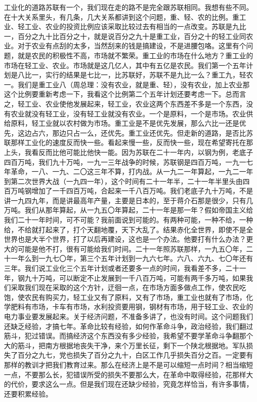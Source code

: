 工业化的道路苏联有一个，我们现在走的路不是完全跟苏联相同。我想有些不同。在十大关系里头，有几条，几大关系都讲到这个问题，重、轻、农的比例。重工业、轻工业、农业的投资比例应该采取比较过去有相当的一点改变。苏联是九比一，百分之九十比百分之十，就是说百分之九十是重工业，百分之十的轻工业同农业。对于农业有点刮的太多，当然刮来的钱是搞建设，不是进腰包咯。这里有个问题，就是农民的积极性不高，市场就不繁荣。重工业的市场在什么地方？重工业的市场在轻工业、农业。市场就是这几亿人，其中有五亿是农民。我们第一个五年计划是八比一，实行的结果是七比一，比苏联好，苏联不是九比一么？重工九，轻农一。我们是重工业八（周总理：没有农业，就是重、轻），没有农业，加上农业那这个比例要重新考虑一下，我看这个比例第二个五年计划还要考虑一下。总而言之，轻工业、农业使他发展起来，轻工业，农业这两个东西差不多是一个东西，没有农业就没有轻工业，没有轻工业就没有农业。一个是原料，一个是市场。农业供给原料，轻工业就以农村做为市场。重工业是不是优先发展，那么六比一还是优先，这边占六，那边只占一么，还优先。重工业还优先。但走新的道路，是否比苏联那样工业化的速度反而快一些。看起来慢一些，反而快一些，现在希望寄托在那上头，我看反而比他可能比他快一能。因为苏联在二十一年内，以钢为例，老底子四百万吨，我们九十万吨，一九一三年战争的时候，苏联钢是四百万吨，一九一七年革命，一八、一九、二〇这三年不算，打内战。从一九二一年算起，一九二一年到第二次世界大战（一九四一年），这个时间有二十一年半，二十一年半里头由四百万吨钢增加了一千四百万吨，合起来一千八百万吨。我们老底子九十万吨，不是讲一九四九年，而是讲最高年产量，主要是日本的，至于蒋介石那是很少，只有几万吨。我们从那年算起，从一九五〇年算起，二十一年是那一年？假如帝国主义给我们二十一年时间，可不可能？我前面说到可能的。有两种可能，一种不给，一种给，不给就打起来了，打个天翻地覆，天下大乱了。结果赤化全世界，即使不是全世界也是大半个世界，打了以后再建设，这也是一个办法。他要打有什么办法？更大的可能是他不打，很有可能给我们时间。二十一年照苏联那样，一九五〇年，二十一年么到一九七〇年，第三个五年计划到一九六七年。六八、六九、七〇年还有三年。我们说工业化三个五年计划或者还要多一点的时间，我看差不多，二十一年，钢九十万吨，可以断定不止发展到一千八百万吨，可能有两千多万吨，如果我们采取我们现在采取的这个方针，迂徊一点，在市场方面多做点工作，使农民吃饱，使农民有购买力，轻工业又有了原料，又有了市场，重工业也就有了市场，化学肥料有市场，卡车有市场，水利投资要用钢，钢材有市场，用于轻工业、农业的电力事业要发展起来。关于经济问题，不准备多讲了，也没有时间。这个问题我们还缺乏经验，才搞七年。革命比较有经验，如何作革命斗争，政治经验，我们翻过筋斗，犯过错误。而搞经济这个东西没有多少经验，我希望不要学革命斗争翻那个大的筋斗，把南方根据地丧失干净，来个万里长征，剩下一个陕北根据地。军队损失了百分之九七，党也损失了百分之九十，白区工作几乎损失百分之百。一定要有那样的教训才把我们教育过来。那么在经济上是不是可以缩短一点时间？相当缩短一点，不要那么长，犯错误所受的损失不要那么大，在革命中取得经验，花那样大的代价，要求这么一点。但是我们现在还缺少经验，究竟怎样恰当，有许多事情，还要积累经验。


